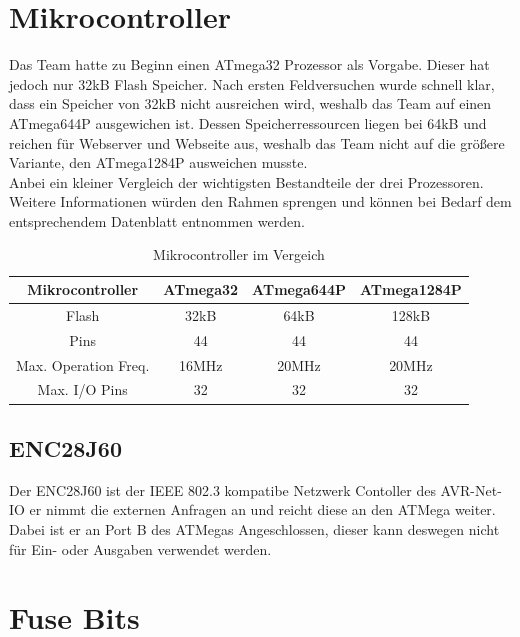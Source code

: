 \section{Mikrocontroller}
Das Team hatte zu Beginn einen ATmega32 Prozessor als Vorgabe. Dieser hat jedoch nur 32kB Flash Speicher. Nach ersten 
Feldversuchen wurde schnell klar, dass ein Speicher von 32kB nicht ausreichen wird, weshalb das Team auf einen ATmega644P 
ausgewichen ist. Dessen Speicherressourcen liegen bei 64kB und reichen für Webserver und Webseite aus, weshalb das Team 
nicht auf die größere Variante, den ATmega1284P ausweichen musste.\\ 
Anbei ein kleiner Vergleich der wichtigsten Bestandteile der 
drei Prozessoren. Weitere Informationen würden den Rahmen sprengen und können
bei Bedarf dem entsprechendem Datenblatt entnommen werden.

\begin{table}[H]
\begin{tabular}{|c|c|c|c|} \hline 
  Mikrocontroller & ATmega32 & ATmega644P & ATmega1284P \\ \hline 
  Flash & 32kB & 64kB & 128kB \\ \hline
  Pins & 44 & 44 & 44 \\ \hline
  Max. Operation Freq. & 16MHz & 20MHz & 20MHz\\ \hline
  Max. I/O Pins & 32 & 32 & 32 \\ \hline
\end{tabular}
\caption{Mikrocontroller im Vergeich}
\label{mikrocontroller}
\end{table}

\subsection{ENC28J60}

Der ENC28J60 ist der IEEE 802.3 kompatibe Netzwerk Contoller des AVR-Net-IO er
nimmt die externen Anfragen an und reicht diese an den ATMega weiter. Dabei ist
er an Port B des ATMegas Angeschlossen, dieser kann deswegen nicht für Ein- oder
Ausgaben verwendet werden.

\newpage
\section{Fuse Bits}
\label{chap:Fuse}

